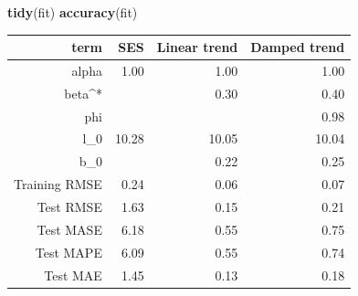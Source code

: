 \documentclass[]{book}
\newenvironment{Shaded}{\begin{snugshade}}{\end{snugshade}}
\newcommand{\DataTypeTok}[1]{\textcolor[rgb]{0.13,0.29,0.53}{#1}}
\newcommand{\DecValTok}[1]{\textcolor[rgb]{0.00,0.00,0.81}{#1}}
\newcommand{\KeywordTok}[1]{\textcolor[rgb]{0.13,0.29,0.53}{\textbf{#1}}}
\newcommand{\NormalTok}[1]{#1}
\newcommand{\OperatorTok}[1]{\textcolor[rgb]{0.81,0.36,0.00}{\textbf{#1}}}
\newcommand{\StringTok}[1]{\textcolor[rgb]{0.31,0.60,0.02}{#1}}
\begin{document}
\begin{Shaded}
\end{Shaded}

\begin{Shaded}
\begin{Highlighting}[]
\KeywordTok{tidy}\NormalTok{(fit)}
\KeywordTok{accuracy}\NormalTok{(fit)}
\end{Highlighting}
\end{Shaded}

\begin{tabular}{rrrr}
\toprule
term & SES & Linear trend & Damped trend\\
\midrule
alpha & 1.00 & 1.00 & 1.00\\
beta\textasciicircum{}* &  & 0.30 & 0.40\\
phi &  &  & 0.98\\
l\_0 & 10.28 & 10.05 & 10.04\\
b\_0 &  & 0.22 & 0.25\\
\addlinespace
Training RMSE & 0.24 & 0.06 & 0.07\\
Test RMSE & 1.63 & 0.15 & 0.21\\
Test MASE & 6.18 & 0.55 & 0.75\\
Test MAPE & 6.09 & 0.55 & 0.74\\
Test MAE & 1.45 & 0.13 & 0.18\\
\bottomrule
\end{tabular}
\end{document}
